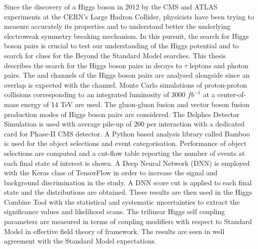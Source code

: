 Since the discovery of a Higgs boson in 2012 by the CMS and ATLAS experiments at the CERN's Large Hadron Collider, physicists have been trying to measure accurately its properties and to understand better the underlying electroweak symmetry breaking mechanism. In this pursuit, the search for Higgs boson pairs is crucial to test our understanding of the Higgs potential and to search for clues for the Beyond the Standard Model searches. This thesis describes the search for the Higgs boson pairs in decays to $\tau$ leptons and photon pairs. The \wwgg and \zzgg channels of the Higgs boson pairs are analysed alongside since an overlap is expected with the \ttgg channel. Monte Carlo simulations of proton-proton collisions corresponding to an integrated luminosity of 3000 $fb^{-1}$  at a center-of-mass energy of 14 TeV are used. The gluon-gluon fusion and vector boson fusion production modes of Higgs boson pairs are considered. The Delphes Detector Simulation is used with average pile-up of 200 per interaction with a dedicated card for Phase-II CMS detector. A Python based analysis library called Bamboo is used for the object selections and event categorisation. Performance of object selections are computed and a cut-flow table reporting the number of events at each final state of interest is shown. A Deep Neural Network (DNN) is employed with the Keras class of TensorFlow in order to increase the signal and background discrimination in the study. A DNN score cut is applied to each final state and the distributions are obtained. These results are then used in the Higgs Combine Tool with the statistical and systematic uncertainties to extract the significance values and likelihood scans. The trilinear Higgs self coupling parameters are measured in terms of coupling modifiers with respect to Standard Model in effective field theory of \kl framework. The results are seen in well agreement with the Standard Model expectations.